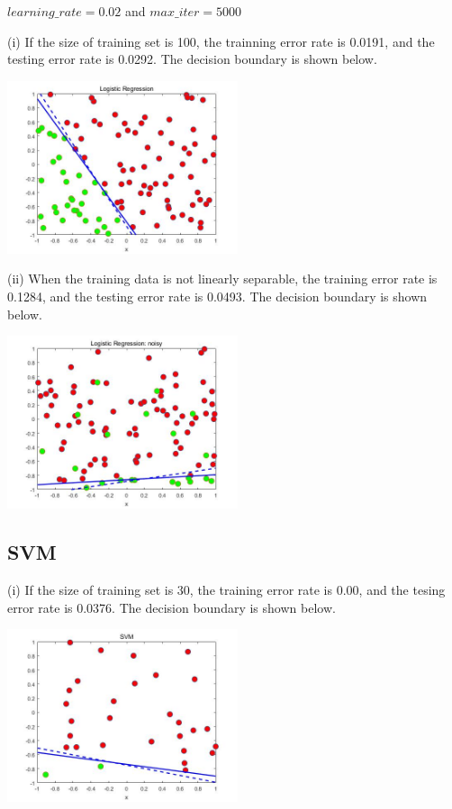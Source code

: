 \documentclass[11pt]{article} %
\begin{document}
$learning\_rate = 0.02$ and 
$max\_iter = 5000$

(i) If the size of training set is 100, the trainning error rate is 0.0191, and the testing error rate is 0.0292. The decision boundary is shown below.

\begin{center}
\includegraphics[height=2in]{./Logistic_i.jpg}
\end{center}

(ii) When the training data is not linearly separable, the training error rate is 0.1284, and the testing error rate is 0.0493. The decision boundary is shown below.

\begin{center}
\includegraphics[height=2in]{./Logistic_ii.jpg}
\end{center}


\subsection{SVM}

(i) If the size of training set is 30, the training error rate is 0.00, and the tesing error rate is 0.0376. The decision boundary is shown below.

\begin{center}
\includegraphics[height=2in]{./SVM_i.jpg}
\end{center}
 
\end{document}

